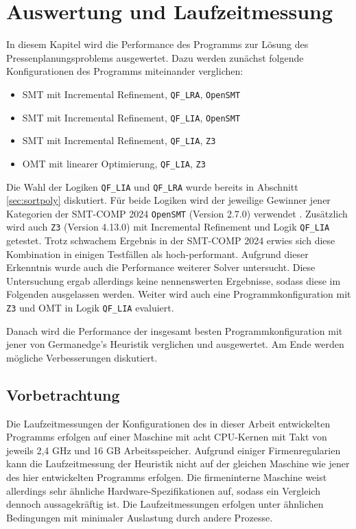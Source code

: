 \chapter{Auswertung und Laufzeitmessung}
\label{chapter:auswertung}
In diesem Kapitel wird die Performance des Programms zur Lösung des Pressenplanungsproblems ausgewertet.
Dazu werden zunächst folgende Konfigurationen des Programms miteinander verglichen:
\begin{itemize}
    \item SMT mit Incremental Refinement, \texttt{QF\_LRA}, \texttt{OpenSMT}
    \item SMT mit Incremental Refinement, \texttt{QF\_LIA}, \texttt{OpenSMT}
    \item SMT mit Incremental Refinement, \texttt{QF\_LIA}, \texttt{Z3}
    \item OMT mit linearer Optimierung, \texttt{QF\_LIA}, \texttt{Z3}
\end{itemize}

Die Wahl der Logiken \texttt{QF\_LIA} und \texttt{QF\_LRA} wurde bereits in Abschnitt \ref{sec:sortpoly} diskutiert.
Für beide Logiken wird der jeweilige Gewinner jener Kategorien der SMT-COMP 2024 \texttt{OpenSMT} (Version 2.7.0) verwendet \cite{smtcomp2024results}.
Zusätzlich wird auch \texttt{Z3} (Version 4.13.0) mit Incremental Refinement und Logik \texttt{QF\_LIA} getestet.
Trotz schwachem Ergebnis in der SMT-COMP 2024 erwies sich diese Kombination in einigen Testfällen als hoch-performant.
Aufgrund dieser Erkenntnis wurde auch die Performance weiterer Solver untersucht.
Diese Untersuchung ergab allerdings keine nennenswerten Ergebnisse, sodass diese im Folgenden ausgelassen werden.
Weiter wird auch eine Programmkonfiguration mit \texttt{Z3} und OMT in Logik \texttt{QF\_LIA} evaluiert.

Danach wird die Performance der insgesamt besten Programmkonfiguration mit jener von Germanedge's Heuristik verglichen und ausgewertet.
Am Ende werden mögliche Verbesserungen diskutiert.

\section{Vorbetrachtung}
Die Laufzeitmessungen der Konfigurationen des in dieser Arbeit entwickelten Programms erfolgen auf einer Maschine mit
acht CPU-Kernen mit Takt von jeweils 2,4 GHz und 16 GB Arbeitsspeicher.
Aufgrund einiger Firmenregularien kann die Laufzeitmessung der Heuristik nicht auf der gleichen Maschine wie jener des hier entwickelten Programms erfolgen.
Die firmeninterne Maschine weist allerdings sehr ähnliche Hardware-Spezifikationen auf, sodass ein Vergleich dennoch aussagekräftig ist.
Die Laufzeitmessungen erfolgen unter ähnlichen Bedingungen mit minimaler Auslastung durch andere Prozesse.

